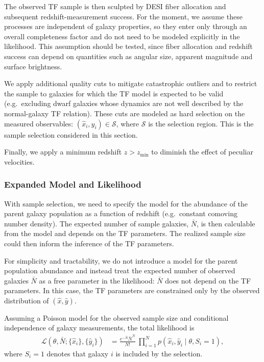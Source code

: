The observed TF sample is then sculpted by DESI fiber allocation and subsequent redshift-measurement success.
For the moment, we assume these processes are independent of galaxy properties, so they
enter only through an overall completeness factor and do not need to be modeled explicitly in the likelihood.
This assumption should be tested, since fiber allocation and redshift success can depend on quantities such as
angular size, apparent magnitude and surface brightness.

We apply additional quality cuts to mitigate catastrophic outliers and to restrict the sample to galaxies for which
the TF model is expected to be valid (e.g.\ excluding dwarf galaxies whose dynamics are not well described by
the normal-galaxy TF relation).
These cuts are modeled as hard selection on the measured observables:
$(\hat x_i,\hat y_i)\in\mathcal S$, where $\mathcal S$ is the selection region.
This is the sample selection considered in this section.

Finally, we apply a minimum redshift $z>z_{\text{min}}$ to diminish the effect of peculiar velocities.

\subsubsection{Expanded Model and Likelihood}
With sample selection, we need to specify the model for the abundance of the parent galaxy population
as a function of redshift (e.g.\ constant comoving number density).
The expected number of sample galaxies, $\bar N$, is then calculable from the model and depends on the TF parameters.
The realized sample size could then inform the inference of the TF parameters.

For simplicity and tractability, we do not introduce a model for the parent population abundance and instead treat the expected
number of observed galaxies $\bar N$ as a free parameter in the likelihood: $\bar N$ does not depend on the TF parameters.
In this case, the TF parameters are constrained only by the observed distribution of $(\hat x,\hat y)$.

Assuming a Poisson model for the observed sample size and conditional independence of galaxy measurements,
the total likelihood is
\begin{align}
\mathcal L(\theta,\bar N;\{\hat x_i\},\{\hat y_i\})
&=
\frac{e^{-\bar N}\bar N^{N}}{N!}
\ \prod_{i=1}^{N}
p(\hat x_i,\hat y_i \mid \theta, S_i=1),
\end{align}
where $S_i=1$ denotes that galaxy $i$ is included by the selection.

